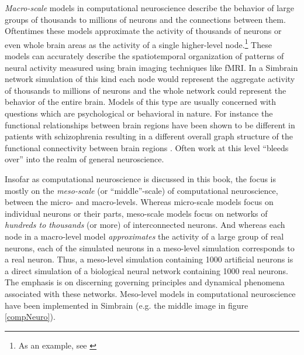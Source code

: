 \emph{Macro-scale} models in computational neuroscience describe the behavior of large groups of thousands to millions of neurons  and the connections between them. Oftentimes these models approximate the activity of thousands of neurons or even whole brain areas as the activity of a single higher-level node.\footnote{As an example, see  \cite{cabral2011role}} These models can accurately describe the spatiotemporal organization of patterns of neural activity measured using brain imaging techniques like fMRI. In a Simbrain network simulation of this kind each node would represent the aggregate activity of thousands to millions of neurons and the whole network could represent the behavior of the entire brain. Models of this type are usually concerned with questions which are psychological or behavioral in nature. For instance the functional relationships between brain regions have been shown to be different in patients with schizophrenia resulting in a different overall graph structure of the functional connectivity between brain regions \cite{bullmore2009complex}. Often work at this level ``bleeds over'' into the realm of general neuroscience.

Insofar as computational neuroscience is discussed in this book, the focus is mostly on the \emph{meso-scale} (or ``middle''-scale) of computational neuroscience, between the micro- and macro-levels. Whereas micro-scale models focus on individual neurons or their parts, meso-scale models focus on networks of \emph{hundreds to thousands} (or more) of interconnected neurons. And whereas each node in a macro-level model \emph{approximates} the activity of a large group of real neurons, each of the simulated neurons in a meso-level simulation corresponds to a real neuron. Thus, a meso-level simulation containing 1000 artificial neurons is a direct simulation of a biological neural network containing 1000 real neurons. The emphasis is on discerning governing principles and dynamical phenomena associated with these networks. Meso-level models in computational neuroscience have been implemented in Simbrain (e.g. the middle image in figure \ref{compNeuro}).


